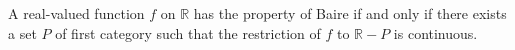 A real-valued function $f$ on $\mathbb{R}$ has the property of Baire if and only if there exists a set $P$ of first category such that the restriction of $f$ to $\mathbb{R} - P$ is continuous.
